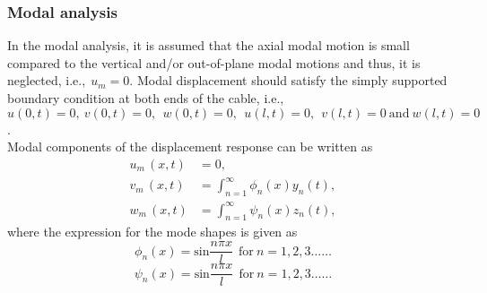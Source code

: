 \documentclass[review]{elsarticle}
\begin{document}
\subsubsection{Modal analysis}
In the modal analysis, it is assumed that the axial modal motion is small compared to the vertical and/or out-of-plane modal motions and thus, it is neglected, i.e.,$\ {\ u}_m=0$. Modal displacement should satisfy the simply supported boundary condition at both ends of the cable, i.e., $u\left(0,t\right)=0,\ v\left(0,t\right)=0,\ \ w\left(0,t\right)=0,\ \ u\left(l,t\right)=0,\ \ v\left(l,t\right)=0\ \mathrm{and}\ w\left(l,t\right)=0$.\\
Modal components of the displacement response can be written as
\begin{equation} \label{GrindEQ__13_} 
\begin{split}
u_{m\ }\left(x,t\right)&=0,\\
v_{m\ }\left(x,t\right)&=\int^{\infty }_{n=1}{{\phi }_n\left(x\right)y_n(t)},\\ 
w_{m\ }\left(x,t\right)&=\int^{\infty }_{n=1}{{\psi }_n\left(x\right)z_n(t)},
\end{split}
\end{equation} 
where the expression for the mode shapes is given as
\[{\phi }_n\left(x\right)={{\mathrm{sin}} \frac{n\pi x}{l}\ }\ \text{for}\ n=1,2,3\dots \dots \] 
\begin{equation} \label{GrindEQ__14_} 
{\psi }_n\left(x\right)={{\mathrm{sin}} \frac{n\pi x}{l}\ }\ \text{for}\ n=1,2,3\dots \dots  
\end{equation} 
\end{document}
